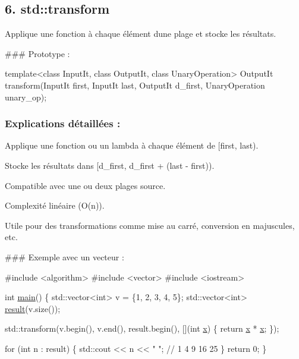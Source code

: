 \subsection*{6. {\bfseries std\+::transform}}

Applique une fonction à chaque élément d\textquotesingle{}une plage et stocke les résultats.

\#\#\# Prototype \+: 
\begin{DoxyCode}
\textcolor{keyword}{template}<\textcolor{keyword}{class} InputIt, \textcolor{keyword}{class} OutputIt, \textcolor{keyword}{class} UnaryOperation>
OutputIt transform(InputIt first, InputIt last, OutputIt d\_first, UnaryOperation unary\_op);
\end{DoxyCode}


\subsubsection*{Explications détaillées \+:}


\begin{DoxyItemize}
\item Applique une fonction ou un lambda à chaque élément de {\ttfamily \mbox{[}first, last)}.
\item Stocke les résultats dans {\ttfamily \mbox{[}d\+\_\+first, d\+\_\+first + (last -\/ first))}.
\item Compatible avec une ou deux plages source.
\item Complexité linéaire (O(n)).
\item Utile pour des transformations comme mise au carré, conversion en majuscules, etc.
\end{DoxyItemize}

\#\#\# Exemple avec un vecteur \+: 
\begin{DoxyCode}
\textcolor{preprocessor}{#include <algorithm>}
\textcolor{preprocessor}{#include <vector>}
\textcolor{preprocessor}{#include <iostream>}

\textcolor{keywordtype}{int} \hyperlink{htop_8c_a3c04138a5bfe5d72780bb7e82a18e627}{main}() \{
    std::vector<int> v = \{1, 2, 3, 4, 5\};
    std::vector<int> \hyperlink{namespaceconnexion__SSH_ab06475dbad7f16b89c9114749bc95254}{result}(v.size());

    std::transform(v.begin(), v.end(), result.begin(), [](\textcolor{keywordtype}{int} \hyperlink{addition_8c_a6150e0515f7202e2fb518f7206ed97dc}{x}) \{ \textcolor{keywordflow}{return} \hyperlink{addition_8c_a6150e0515f7202e2fb518f7206ed97dc}{x} * 
      \hyperlink{addition_8c_a6150e0515f7202e2fb518f7206ed97dc}{x}; \});

    \textcolor{keywordflow}{for} (\textcolor{keywordtype}{int} n : result) \{
        std::cout << n << \textcolor{stringliteral}{" "}; \textcolor{comment}{// 1 4 9 16 25}
    \}
    \textcolor{keywordflow}{return} 0;
\}
\end{DoxyCode}
 



